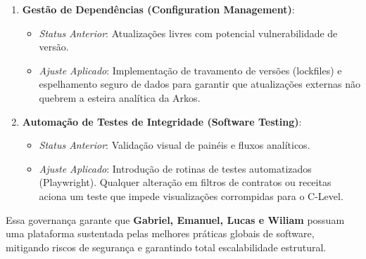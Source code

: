 \begin{enumerate}
    \item \textbf{Gestão de Dependências (Configuration Management)}:
    \begin{itemize}
        \item \textit{Status Anterior}: Atualizações livres com potencial vulnerabilidade de versão.
        \item \textit{Ajuste Aplicado}: Implementação de travamento de versões (lockfiles) e espelhamento seguro de dados para garantir que atualizações externas não quebrem a esteira analítica da Arkos.
    \end{itemize}
    \item \textbf{Automação de Testes de Integridade (Software Testing)}:
    \begin{itemize}
        \item \textit{Status Anterior}: Validação visual de painéis e fluxos analíticos.
        \item \textit{Ajuste Aplicado}: Introdução de rotinas de testes automatizados (Playwright). Qualquer alteração em filtros de contratos ou receitas aciona um teste que impede visualizações corrompidas para o C-Level.
    \end{itemize}
\end{enumerate}

Essa governança garante que \textbf{Gabriel, Emanuel, Lucas e Wiliam} possuam uma plataforma sustentada pelas melhores práticas globais de software, mitigando riscos de segurança e garantindo total escalabilidade estrutural.
